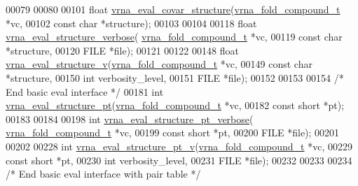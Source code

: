 \begin{DoxyCode}
00079 
00080 
00101 \textcolor{keywordtype}{float} \hyperlink{group__eval_ga6cea75c0eb9857fb59172be54cab09e0}{vrna\_eval\_covar\_structure}(\hyperlink{group__fold__compound_structvrna__fc__s}{vrna\_fold\_compound\_t}  *vc,
00102                                 \textcolor{keyword}{const} \textcolor{keywordtype}{char}            *structure);
00103 
00104 
00118 \textcolor{keywordtype}{float} \hyperlink{group__eval_ga0928d699d310178f84ee2351034e5cb5}{vrna\_eval\_structure\_verbose}(
      \hyperlink{group__fold__compound_structvrna__fc__s}{vrna\_fold\_compound\_t}  *vc,
00119                                   \textcolor{keyword}{const} \textcolor{keywordtype}{char}            *structure,
00120                                   FILE                  *file);
00121 
00122 
00148 \textcolor{keywordtype}{float} \hyperlink{group__eval_gab12e6b1226227670322150df018734f8}{vrna\_eval\_structure\_v}(\hyperlink{group__fold__compound_structvrna__fc__s}{vrna\_fold\_compound\_t}  *vc,
00149                             \textcolor{keyword}{const} \textcolor{keywordtype}{char}            *structure,
00150                             \textcolor{keywordtype}{int}                   verbosity\_level,
00151                             FILE                  *file);
00152 
00153 
00154 \textcolor{comment}{/* End basic eval interface */}
00181 \textcolor{keywordtype}{int} \hyperlink{group__eval_gadbd09372ddfd7a450bbd590c96a6bfe4}{vrna\_eval\_structure\_pt}(\hyperlink{group__fold__compound_structvrna__fc__s}{vrna\_fold\_compound\_t} *vc,
00182                            \textcolor{keyword}{const} \textcolor{keywordtype}{short}          *pt);
00183 
00184 
00198 \textcolor{keywordtype}{int} \hyperlink{group__eval_ga8a517cfeeae8c376ae7b1e0c401d38b4}{vrna\_eval\_structure\_pt\_verbose}(
      \hyperlink{group__fold__compound_structvrna__fc__s}{vrna\_fold\_compound\_t} *vc,
00199                                    \textcolor{keyword}{const} \textcolor{keywordtype}{short}          *pt,
00200                                    FILE                 *file);
00201 
00202 
00228 \textcolor{keywordtype}{int} \hyperlink{group__eval_ga2c6533ba0afe4c88d335d8f1e0e2a48e}{vrna\_eval\_structure\_pt\_v}(\hyperlink{group__fold__compound_structvrna__fc__s}{vrna\_fold\_compound\_t} *vc,
00229                              \textcolor{keyword}{const} \textcolor{keywordtype}{short}          *pt,
00230                              \textcolor{keywordtype}{int}                  verbosity\_level,
00231                              FILE                 *file);
00232 
00233 
00234 \textcolor{comment}{/* End basic eval interface with pair table */}

\end{DoxyCode}
